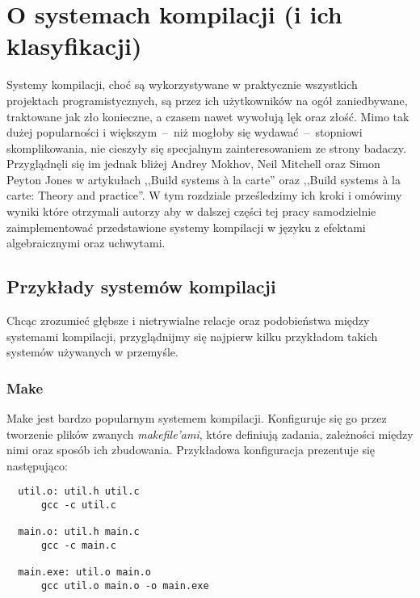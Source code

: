 
\newcommand{\inl}[1]{\lstinline[style=haskell-inl]{#1}}

\chapter{O systemach kompilacji (i ich klasyfikacji)}

Systemy kompilacji, choć są wykorzystywane w praktycznie wszystkich projektach programistycznych, są przez ich użytkowników na ogół zaniedbywane, traktowane jak zło konieczne, a czasem nawet wywołują lęk oraz złość. Mimo tak dużej popularności i większym~--~niż mogłoby się wydawać~--~stopniowi skomplikowania, nie cieszyły się specjalnym zainteresowaniem ze strony badaczy. Przyglądnęli się im jednak bliżej Andrey Mokhov, Neil Mitchell oraz Simon Peyton Jones w artykułach ,,Build systems {\`a} la carte''\cite{mokhov2018build} oraz ,,Build systems {\`a} la carte: Theory and practice''\cite{mokhov2020build}. W tym rozdziale prześledzimy ich kroki i omówimy wyniki które otrzymali autorzy aby w dalszej części tej pracy samodzielnie zaimplementować przedstawione systemy kompilacji w języku z efektami algebraicznymi oraz uchwytami.

\section{Przykłady systemów kompilacji}

Chcąc zrozumieć głębsze i nietrywialne relacje oraz podobieństwa między systemami kompilacji, przyglądnijmy się najpierw kilku przykładom takich systemów używanych w przemyśle.

\subsection{Make}

Make jest bardzo popularnym systemem kompilacji. Konfiguruje się go przez tworzenie plików zwanych \textit{makefile'ami}, które definiują zadania, zależności między nimi oraz sposób ich zbudowania. Przykładowa konfiguracja prezentuje się następująco:

\lstset{language=make}

\begin{lstlisting}
  util.o: util.h util.c
      gcc -c util.c

  main.o: util.h main.c
      gcc -c main.c

  main.exe: util.o main.o
      gcc util.o main.o -o main.exe
\end{lstlisting}

